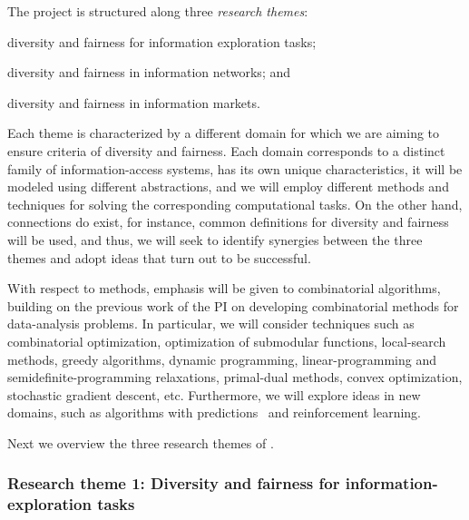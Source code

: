 \documentclass[a4paper,11pt]{article}
\begin{document}
The project is structured along three {\em research themes}:
\vspace{-1mm}
\begin{description}
\setlength{\itemsep}{-4pt}
\item[{\exploration}\,:] 
diversity and fairness for information exploration tasks;
\item[{\networks}\,:]
diversity and fairness in information networks; and 
\item[{\markets}\,:]
diversity and fairness in information markets.
\end{description}
\vspace{-1mm}
Each theme is characterized by a different domain
for which we are aiming to ensure criteria of diversity and fairness. 
Each domain corresponds to a distinct family of information-access systems, 
has its own unique characteristics, 
it will be modeled using different abstractions, 
and we will employ different methods and techniques for solving the corresponding 
computational tasks. 
On the other hand, connections do exist, 
for instance, common definitions for diversity and fairness will be used, 
and thus, we will seek to identify synergies between the three themes
and adopt ideas that turn out to be successful.

With respect to methods, 
emphasis will be given to combinatorial algorithms,
building on the previous work of the PI 
on developing combinatorial methods for data-analysis problems.
In particular, we will consider techniques such as 
combinatorial optimization, 
optimization of submodular functions, 
local-search methods, 
greedy algorithms, 
dynamic pro\-gram\-ming, 
linear-pro\-gram\-ming and semi\-def\-ini\-te-pro\-gram\-ming relaxations, 
primal-dual methods, convex optimization,
stochastic gradient descent, etc. 
Furthermore, we will explore ideas in new domains, 
such as 
algorithms with predictions~\cite{mitzenmacher2022algorithms} and
reinforcement learning.

Next we overview the three research themes of \acronym.


\subsubsection*{Research theme 1: Diversity and fairness for information-exploration tasks}

\iffalse
\noindent
\hspace{-3mm}\colorbox{verylightmagenta}{
\begin{minipage}{\textwidth}
\end{minipage}}
\end{document}
